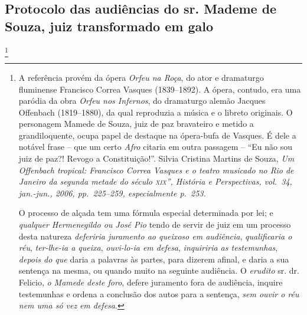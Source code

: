 \asterisc{}

\subsection{Protocolo das audiências do sr. Mademe de Souza, juiz transformado em
galo}\footnote{ A referência provém da ópera \emph{Orfeu na Roça}, do
  ator e dramaturgo fluminense Francisco Correa Vasques (1839--1892). A
  ópera, contudo, era uma paródia da obra \emph{Orfeu nos Infernos}, do
  dramaturgo alemão Jacques Offenbach (1819--1880), da qual reproduzia a
  música e o libreto originais. O personagem Mamede de Souza, juiz de
  paz bravateiro e metido a grandiloquente, ocupa papel de destaque na
  ópera-bufa de Vasques. É dele a notável frase -- que um certo
  \emph{Afro} citaria em outra passagem -- ``Eu não sou juiz de paz?!
  Revogo a Constituição!''. Silvia Cristina Martins de Souza, \emph{Um
  Offenbach tropical: Francisco Correa Vasques e o teatro musicado no
  Rio de Janeiro da segunda metade do século \textsc{xix}'', História e
  Perspectivas, vol.~34, jan.-jun., 2006, pp.~225--259, especialmente
  p.~253.}

O processo de alçada tem uma fórmula especial determinada por lei; e
\emph{qualquer Hermenegildo ou José Pio} tendo de servir de juiz em um
processo desta natureza \emph{deferiria juramento ao queixoso em
audiência}, \emph{qualificaria o réu}, \emph{ter-lhe-ia a queixa},
\emph{ouvi-lo-ia em defesa}, \emph{inquiriria as testemunhas},
\emph{depois do que} daria a palavras às partes, para dizerem afinal, e
daria a sua sentença na mesma, ou quando muito na seguinte audiência. O
\emph{erudito} sr. dr. Felicio, \emph{o Mamede deste foro}, defere
juramento fora de audiência, inquire testemunhas e ordena a conclusão
dos autos para a sentença, \emph{sem ouvir o réu} \emph{nem uma só vez}
\emph{em defesa}.

}
